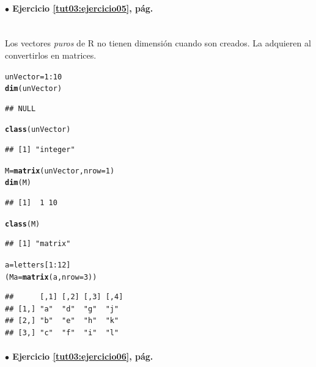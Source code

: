 \documentclass[10pt,a4paper]{article}\usepackage[]{graphicx}\usepackage[]{color}
\makeatletter
\newcommand{\hlnum}[1]{\textcolor[rgb]{0.686,0.059,0.569}{#1}}%
\newcommand{\hlopt}[1]{\textcolor[rgb]{0,0,0}{#1}}%
\newcommand{\hlstd}[1]{\textcolor[rgb]{0.345,0.345,0.345}{#1}}%
\newcommand{\hlkwb}[1]{\textcolor[rgb]{0.69,0.353,0.396}{#1}}%
\newcommand{\hlkwc}[1]{\textcolor[rgb]{0.333,0.667,0.333}{#1}}%
\newcommand{\hlkwd}[1]{\textcolor[rgb]{0.737,0.353,0.396}{\textbf{#1}}}%
\newenvironment{kframe}{%
 \def\at@end@of@kframe{}%
 \ifinner\ifhmode%
  \def\at@end@of@kframe{\end{minipage}}%
  \begin{minipage}{\columnwidth}%
 \fi\fi%
 \def\FrameCommand##1{\hskip\@totalleftmargin \hskip-\fboxsep
 \colorbox{shadecolor}{##1}\hskip-\fboxsep
     \hskip-\linewidth \hskip-\@totalleftmargin \hskip\columnwidth}%
 \MakeFramed {\advance\hsize-\width
   \@totalleftmargin\z@ \linewidth\hsize
   \@setminipage}}%
 {\par\unskip\endMakeFramed%
 \at@end@of@kframe}
\newenvironment{knitrout}{}{} %
\makeatother
\begin{document}
\paragraph{\bf $\bullet$ Ejercicio \ref{tut03:ejercicio05}, pág. \pageref{tut03:ejercicio05}}
\label{tut03:ejercicio05:sol}\quad\\

Los vectores {\em puros} de R no tienen dimensión cuando son creados. La adquieren al convertirlos en matrices.
\begin{knitrout}
\color{fgcolor}\begin{kframe}
\begin{alltt}
\hlstd{unVector} \hlkwb{=} \hlnum{1}\hlopt{:}\hlnum{10}
\hlkwd{dim}\hlstd{(unVector)}
\end{alltt}
\begin{verbatim}
## NULL
\end{verbatim}
\begin{alltt}
\hlkwd{class}\hlstd{(unVector)}
\end{alltt}
\begin{verbatim}
## [1] "integer"
\end{verbatim}
\begin{alltt}
\hlstd{M} \hlkwb{=} \hlkwd{matrix}\hlstd{(unVector,} \hlkwc{nrow}\hlstd{=}\hlnum{1}\hlstd{)}
\hlkwd{dim}\hlstd{(M)}
\end{alltt}
\begin{verbatim}
## [1]  1 10
\end{verbatim}
\begin{alltt}
\hlkwd{class}\hlstd{(M)}
\end{alltt}
\begin{verbatim}
## [1] "matrix"
\end{verbatim}
\begin{alltt}
\hlstd{a}\hlkwb{=}\hlstd{letters[}\hlnum{1}\hlopt{:}\hlnum{12}\hlstd{]}
\hlstd{(Ma} \hlkwb{=} \hlkwd{matrix}\hlstd{(a,} \hlkwc{nrow}\hlstd{=}\hlnum{3}\hlstd{))}
\end{alltt}
\begin{verbatim}
##      [,1] [,2] [,3] [,4]
## [1,] "a"  "d"  "g"  "j" 
## [2,] "b"  "e"  "h"  "k" 
## [3,] "c"  "f"  "i"  "l"
\end{verbatim}
\end{kframe}
\end{knitrout}


\paragraph{\bf $\bullet$ Ejercicio \ref{tut03:ejercicio06}, pág. \pageref{tut03:ejercicio06}}
\label{tut03:ejercicio06:sol}\quad\\
\end{document}
